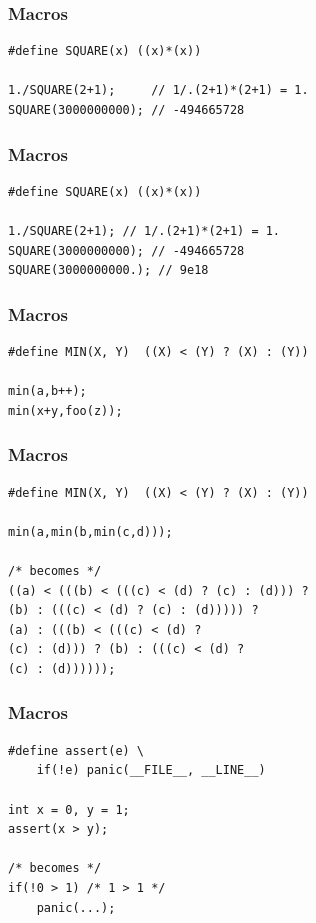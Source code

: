 \documentclass[12pt,compress]{beamer}
\begin{document}
\begin{frame}[fragile]
\frametitle{Macros}

\begin{lstlisting}
#define SQUARE(x) ((x)*(x))

1./SQUARE(2+1);     // 1/.(2+1)*(2+1) = 1.
SQUARE(3000000000); // -494665728
\end{lstlisting}
\end{frame}

\begin{frame}[fragile]
\frametitle{Macros}

\begin{lstlisting}
#define SQUARE(x) ((x)*(x))

1./SQUARE(2+1); // 1/.(2+1)*(2+1) = 1.
SQUARE(3000000000); // -494665728
SQUARE(3000000000.); // 9e18
\end{lstlisting}
\end{frame}

\begin{frame}[fragile]
\frametitle{Macros}

\begin{lstlisting}
#define MIN(X, Y)  ((X) < (Y) ? (X) : (Y))

min(a,b++);
min(x+y,foo(z));
\end{lstlisting}
\end{frame}

\begin{frame}[fragile]
\frametitle{Macros}

\begin{lstlisting}
#define MIN(X, Y)  ((X) < (Y) ? (X) : (Y))

min(a,min(b,min(c,d)));

/* becomes */
((a) < (((b) < (((c) < (d) ? (c) : (d))) ?
(b) : (((c) < (d) ? (c) : (d))))) ?
(a) : (((b) < (((c) < (d) ?
(c) : (d))) ? (b) : (((c) < (d) ?
(c) : (d))))));
\end{lstlisting}
\end{frame}

\begin{frame}[fragile]
\frametitle{Macros}

\begin{lstlisting}
#define assert(e) \
	if(!e) panic(__FILE__, __LINE__)

int x = 0, y = 1;
assert(x > y);

/* becomes */
if(!0 > 1) /* 1 > 1 */
    panic(...);
\end{lstlisting}
\end{frame}
\end{document}
